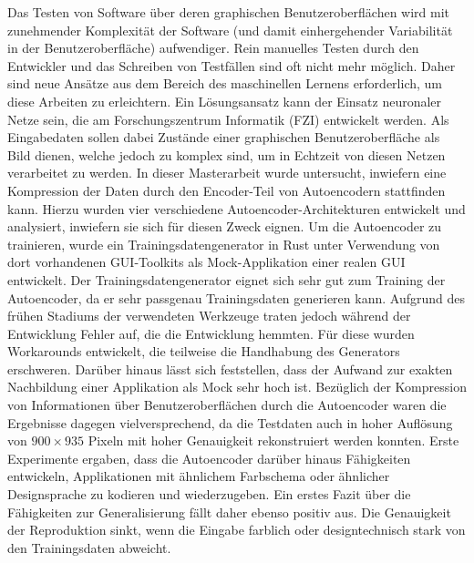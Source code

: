 
\Abstract
Das Testen von Software über deren graphischen Benutzeroberflächen wird mit zunehmender Komplexität der Software (und damit einhergehender Variabilität in der Benutzeroberfläche) aufwendiger. Rein manuelles Testen durch den Entwickler und das Schreiben von Testfällen sind oft nicht mehr möglich. Daher sind neue Ansätze aus dem Bereich des maschinellen Lernens erforderlich, um diese Arbeiten zu erleichtern. Ein Lösungsansatz kann der Einsatz neuronaler Netze sein, die am Forschungszentrum Informatik (FZI) entwickelt werden. Als Eingabedaten sollen dabei Zustände einer graphischen Benutzeroberfläche als Bild dienen, welche jedoch zu komplex sind, um in Echtzeit von diesen Netzen verarbeitet zu werden. In dieser Masterarbeit wurde untersucht, inwiefern eine Kompression der Daten durch den Encoder-Teil von Autoencodern stattfinden kann. Hierzu wurden vier verschiedene Autoencoder-Architekturen entwickelt und analysiert, inwiefern sie sich für diesen Zweck eignen. Um die Autoencoder zu trainieren, wurde ein Trainingsdatengenerator in Rust unter Verwendung von dort vorhandenen GUI-Toolkits als Mock-Applikation einer realen GUI entwickelt. Der Trainingsdatengenerator eignet sich sehr gut zum Training der Autoencoder, da er sehr passgenau Trainingsdaten generieren kann. Aufgrund des frühen Stadiums der verwendeten Werkzeuge traten jedoch während der Entwicklung Fehler auf, die die Entwicklung hemmten. Für diese wurden Workarounds entwickelt, die teilweise die Handhabung des Generators erschweren. Darüber hinaus lässt sich feststellen, dass der Aufwand zur exakten Nachbildung einer Applikation als Mock sehr hoch ist.
Bezüglich der Kompression von Informationen über Benutzeroberflächen durch die Autoencoder waren die Ergebnisse dagegen vielversprechend, da die Testdaten auch in hoher Auflösung von $900 \times 935$ Pixeln mit hoher Genauigkeit rekonstruiert werden konnten. Erste Experimente ergaben, dass die Autoencoder darüber hinaus Fähigkeiten entwickeln, Applikationen mit ähnlichem Farbschema oder ähnlicher Designsprache zu kodieren und wiederzugeben. Ein erstes Fazit über die Fähigkeiten zur Generalisierung fällt daher ebenso positiv aus. Die Genauigkeit der Reproduktion sinkt, wenn die Eingabe farblich oder designtechnisch stark von den Trainingsdaten abweicht.